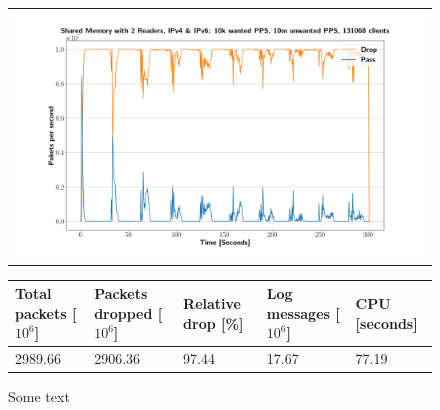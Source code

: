 \begin{figure}[p]
	\label{fig:simplefail2ban:shm:2r}
	\centering
	\scriptsize
	\begin{tabular}{c}
    	\centerline{\includegraphics[width=1.2\textwidth]{images/simplefail2ban_shm_2r_ipv46_v10k_iv10m_c131068.png}}
	\end{tabular}
	\begin{tabular}{lllll}
		\toprule
		\textbf{Total packets [$10^6$]} & \textbf{Packets dropped [$10^6$]} & \textbf{Relative drop [\%]} & \textbf{Log messages [$10^6$]} & \textbf{CPU [seconds]} \\ \midrule 
		2989.66 & 2906.36 & 97.44 & 17.67 & 77.19 \\
		\bottomrule
	\end{tabular}
	\caption[Simplefail2ban, Shared Memory 2 Readers]{Some text}
\end{figure}

